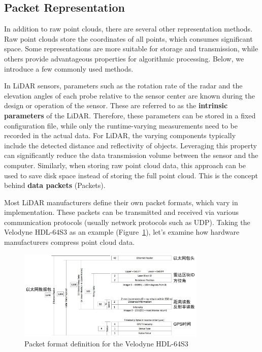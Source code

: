 \subsection{Packet Representation}  

In addition to raw point clouds, there are several other representation methods. Raw point clouds store the coordinates of all points, which consumes significant space. Some representations are more suitable for storage and transmission, while others provide advantageous properties for algorithmic processing. Below, we introduce a few commonly used methods.  

In LiDAR sensors, parameters such as the rotation rate of the radar and the elevation angles of each probe relative to the sensor center are known during the design or operation of the sensor. These are referred to as the \textbf{intrinsic parameters} of the LiDAR. Therefore, these parameters can be stored in a fixed configuration file, while only the runtime-varying measurements need to be recorded in the actual data. For LiDAR, the varying components typically include the detected distance and reflectivity of objects. Leveraging this property can significantly reduce the data transmission volume between the sensor and the computer. Similarly, when storing raw point cloud data, this approach can be used to save disk space instead of storing the full point cloud. This is the concept behind \textbf{data packets} (Packets).  

Most LiDAR manufacturers define their own packet formats, which vary in implementation. These packets can be transmitted and received via various communication protocols (usually network protocols such as UDP). Taking the Velodyne HDL-64S3 as an example (Figure~\ref{fig:packets-example}), let’s examine how hardware manufacturers compress point cloud data.  

\begin{figure}[!htp]  
	\centering  
	\includegraphics[width=0.8\textwidth]{resources/basic-point-cloud/packets.pdf}  
	\caption{Packet format definition for the Velodyne HDL-64S3}  
	\label{fig:packets-example}  
\end{figure}  

